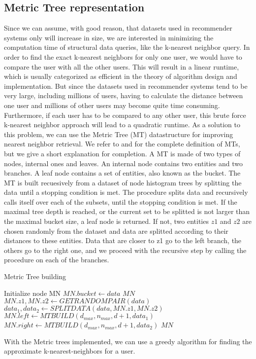 \subsection{Metric Tree representation}
  Since we can assume, with good reason, that datasets used in recommender systems only will increase in size, we are interested in minimizing the computation time of structural data queries, like the k-nearest neighbor query. In order to find the exact k-nearest neighbors for only one user, we would have to compare the user with all the other users. This will result in a linear runtime, which is usually categorized as efficient in the theory of algorithm design and implementation. But since the datasets used in recommender systems tend to be very large, including millions of users, having to calculate the distance between one user and millions of other users may become quite time consuming. Furthermore, if each user has to be compared to any other user, this brute force k-nearest neighbor approach will lead to a quadratic runtime. As a solution to this problem, we can use the Metric Tree (MT) datastructure for improving nearest neighbor retrieval. We refer to \cite{jaeger2019counts} and \cite{uhlmann1991} for the complete definition of MTs, but we give a short explanation for completion.
  A MT is made of two types of nodes, internal ones and leaves. An internal node contains two entities and two branches. A leaf node contains a set of entities, also known as the bucket. The MT is built recuesively from a dataset of node histogram trees by splitting the data until a stopping condition is met. The procedure splits data
  and recursively calls itself over each of the subsets, until the stopping condition is met. If the maximal tree depth is reached, or the current set to be splitted is not larger than the maximal bucket size, a leaf node is returned. If not, two entities $z1$ and $z2$ are chosen randomly from the dataset and data are splitted according to their distances to these entities. Data that are closer to z1 go to the left branch, the others go to the right one, and we proceed with the recursive step by calling the procedure on each of the branches.

  \begin{algorithm}
\caption{Metric Tree building}\label{MT_building}
\begin{algorithmic}[1]
  Initialize node MN
  \State $MN.bucket \gets data$
  \State \Return $MN$
  \EndIf
  \State $MN.z1, MN.z2 \gets GETRANDOMPAIR(data)$
  \State $data_1, data_2 \gets SPLITDATA(data, MN.z1, MN.z2)$
  \State $MN.left \gets MTBUILD(d_{max}, n_{max}, d+1, data_1)$
  \State $MN.right \gets MTBUILD(d_{max}, n_{max}, d+1, data_2)$
  \State \Return $MN$
\EndProcedure
\end{algorithmic}
\end{algorithm}

With the Metric trees implemented, we can use a greedy algorithm for finding the approximate k-nearest-neighbors for a user. 
